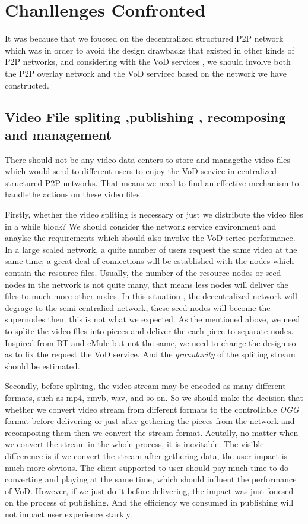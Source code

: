 \section{Chanllenges Confronted}
{
It was because that we foucsed on the decentralized structured P2P network which was in order to avoid the design drawbacks that existed in other kinds of P2P networks, and considering with the VoD services , we should involve both the P2P overlay network and the VoD servicec based on the network we have constructed.

}
\subsection{Video File spliting ,publishing , recomposing and management}
{
  There should not be any video data centers to store and managethe video files which would send to different users to enjoy the VoD service in centralized structured P2P networks. That means we need to find an effective mechanism to handlethe actions on these video files.

Firstly, whether the video spliting is necessary or just we distribute the video files in a while block? We should consider the network service environment and anaylse the requirements which should also involve the VoD serice performance. 
In a large scaled network, a quite number of users request the same video at the same time; a great deal of connections will be established with the nodes which contain the resource files. Usually, the number of the resource nodes or seed nodes in the network is not quite many, that means less nodes will deliver the files to much more other nodes.
In this situation , the decentralized network will degrage to the semi-centralied network, these seed nodes will become the supernodes then. this is not what we expected.
As the mentioned above, we need to splite the video files into pieces and deliver the each piece to separate nodes.
Inspired from BT and eMule but not the same, we need to change the design so as to fix the request the VoD service.
And the \emph{granularity} of the spliting stream should be estimated.

Secondly, before spliting, the video stream may be encoded as many different formats, such as mp4, rmvb, wav, and so on.
So we should make the decision that whether we convert video stream from different formats to the controllable \emph{OGG}  format before delivering or just after gethering the pieces from the network and recomposing them then we convert the stream format.
Acutally, no matter when we convert the stream in the whole process, it is inevitable. The visible diffeerence is if we convert the stream after gethering data, the user impact is much more obvious. The client supported to user should pay much time to do converting and playing at the same time, which should influent the performance of VoD. However, if we just do it before delivering, the impact was just foucsed on the process of publishing.
And the efficiency we consumed in publishing will not impact user experience starkly.

}
